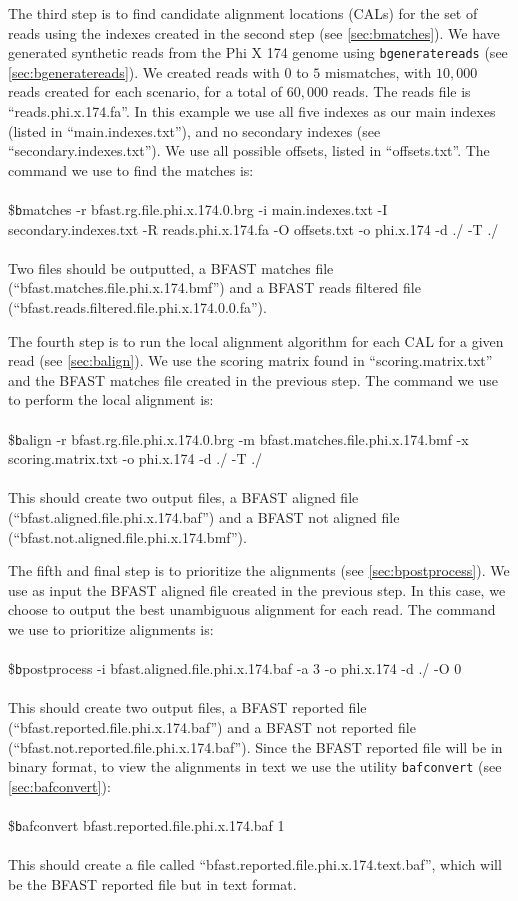 \documentclass[a4paper,12pt]{book}
\newcommand{\TT}[1]{{\tt #1}} %
\newenvironment{script}{\\\\\footnotesize\$\TT}{\normalsize\\\\}
\newcommand{\BMF}{BFAST matches file} %
\newcommand{\BRFF}{BFAST reads filtered file} %
\newcommand{\BAF}{BFAST aligned file} %
\newcommand{\BNAF}{BFAST not aligned file} %
\newcommand{\BRF}{BFAST reported file} %
\newcommand{\BNRF}{BFAST not reported file} %
\begin{document}
The third step is to find candidate alignment locations (CALs) for the set of reads using the indexes created in the second step (see \autoref{sec:bmatches}).
We have generated synthetic reads from the Phi X 174 genome using \TT{bgeneratereads} (see \autoref{sec:bgeneratereads}).
We created reads with $0$ to $5$ mismatches, with $10,000$ reads created for each scenario, for a total of $60,000$ reads.
The reads file is ``reads.phi.x.174.fa''.
In this example we use all five indexes as our main indexes (listed in ``main.indexes.txt''), and no secondary indexes (see ``secondary.indexes.txt'').
We use all possible offsets, listed in ``offsets.txt''.
The command we use to find the matches is:
\begin{script}
	bmatches -r bfast.rg.file.phi.x.174.0.brg -i main.indexes.txt -I secondary.indexes.txt -R reads.phi.x.174.fa -O offsets.txt -o phi.x.174 -d ./ -T ./
\end{script}
Two files should be outputted, a \BMF{} (``bfast.matches.file.phi.x.174.bmf'') and a \BRFF{} (``bfast.reads.filtered.file.phi.x.174.0.0.fa'').

The fourth step is to run the local alignment algorithm for each CAL for a given read (see \autoref{sec:balign}).
We use the scoring matrix found in ``scoring.matrix.txt'' and the \BMF{} created in the previous step.
The command we use to perform the local alignment is:
\begin{script}
	balign -r bfast.rg.file.phi.x.174.0.brg -m bfast.matches.file.phi.x.174.bmf -x scoring.matrix.txt -o phi.x.174 -d ./ -T ./
\end{script}
This should create two output files, a \BAF{} (``bfast.aligned.file.phi.x.174.baf'') and a \BNAF{} (``bfast.not.aligned.file.phi.x.174.bmf'').

The fifth and final step is to prioritize the alignments (see \autoref{sec:bpostprocess}).
We use as input the \BAF{} created in the previous step.
In this case, we choose to output the best unambiguous alignment for each read.
The command we use to prioritize alignments is:
\begin{script}
	bpostprocess -i bfast.aligned.file.phi.x.174.baf -a 3 -o phi.x.174 -d ./ -O 0
\end{script}
This should create two output files, a \BRF{} (``bfast.reported.file.phi.x.174.baf'') and a \BNRF{} (``bfast.not.reported.file.phi.x.174.baf''). 
Since the \BRF{} will be in binary format, to view the alignments in text we use the utility \TT{bafconvert} (see \autoref{sec:bafconvert}):
\begin{script}
	bafconvert bfast.reported.file.phi.x.174.baf 1
\end{script}
This should create a file called ``bfast.reported.file.phi.x.174.text.baf'', which will be the \BRF{} but in text format. 
\end{document}
